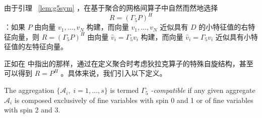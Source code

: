 \documentclass{siamltex}
\begin{document}
由于引理~    \ref{lem:g5sym}   ，在基于聚合的网格间算子中自然而然地选择
$$
  R = (\Gamma_5 P)^H
$$   ：如果    $P$    由向量    $v_1, \ldots, v_N$    构建，而向量    $v_1, \ldots, v_N$    近似具有    $D$    的小特征值的右特征向量，则    $R = (\Gamma_5 P)^H$    由向量    $\hat{v}_i = \Gamma_5 v_i$    构建，而向量    $\hat{v}_i = \Gamma_5 v_i$    近似具有小特征值的左特征向量。

正如在    \cite{MGClark2010_1}    中指出的那样，通过在定义聚合时考虑狄拉克算子的特殊自旋结构，甚至可以得到    $R = P^{H}$   。具体来说，我们引入以下定义。
\begin{definition}
  The aggregation         $ \{ \mathcal{A}_i, \; i=1,\ldots,s \} $         is termed {\em         $\Gamma_5$        -compatible} if any given aggregate         $\mathcal{A}_i$         is composed exclusively of fine variables with spin 0 and 1 or of fine variables with spin 2 and 3.
\end{definition}
\end{document}
